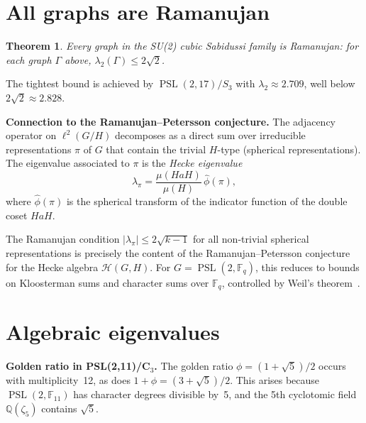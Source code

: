 \documentclass[11pt,a4paper]{article}
\theoremstyle{plain}
\newtheorem{theorem}{Theorem}[section]
\theoremstyle{definition}
\theoremstyle{remark}
\newcommand{\Q}{\mathbb{Q}}
\newcommand{\F}{\mathbb{F}}
\newcommand{\PSL}{\operatorname{PSL}}
\begin{document}
\section{All graphs are Ramanujan}

\begin{tcolorbox}[colback=black!5, colframe=black!5,
  boxrule=0pt, sharp corners]
\begin{theorem}\label{thm:all_ram}
Every graph in the SU(2) cubic Sabidussi family is Ramanujan: for each graph
$\Gamma$ above, $\lambda_2(\Gamma) \leq 2\sqrt{2}$.
\end{theorem}
\end{tcolorbox}

The tightest bound is achieved by $\PSL(2,17)/S_3$ with
$\lambda_2 \approx 2.709$, well below $2\sqrt{2} \approx 2.828$.

\begin{tcolorbox}[breakable, colback=yellow!10, colframe=yellow!10,
  boxrule=0pt, sharp corners]
\textbf{Connection to the Ramanujan--Petersson conjecture.}
The adjacency operator on $\ell^2(G/H)$ decomposes as a direct sum over
irreducible representations $\pi$ of $G$ that contain the trivial
$H$-type (spherical representations). The eigenvalue associated to $\pi$
is the \emph{Hecke eigenvalue}
\[
  \lambda_\pi = \frac{\mu(HaH)}{\mu(H)}\,\hat{\phi}(\pi),
\]
where $\hat\phi(\pi)$ is the spherical transform of the indicator function
of the double coset $HaH$.

The Ramanujan condition $|\lambda_\pi| \leq 2\sqrt{k-1}$ for all
non-trivial spherical representations is precisely the content of the
Ramanujan--Petersson conjecture for the Hecke algebra $\mathcal{H}(G,H)$.
For $G = \PSL(2,\F_q)$, this reduces to bounds on Kloosterman sums and
character sums over $\F_q$, controlled by Weil's theorem~\cite{Weil}.
\end{tcolorbox}


\section{Algebraic eigenvalues}

\begin{tcolorbox}[colback=yellow!10, colframe=yellow!10,
  boxrule=0pt, sharp corners]
\textbf{Golden ratio in PSL(2,11)/C$_3$.}
The golden ratio $\phi = (1+\sqrt{5})/2$ occurs with multiplicity~12,
as does $1+\phi = (3+\sqrt{5})/2$. This arises because $\PSL(2,\F_{11})$
has character degrees divisible by~5, and the 5th cyclotomic field
$\Q(\zeta_5)$ contains $\sqrt{5}$.
\end{tcolorbox}
\end{document}
